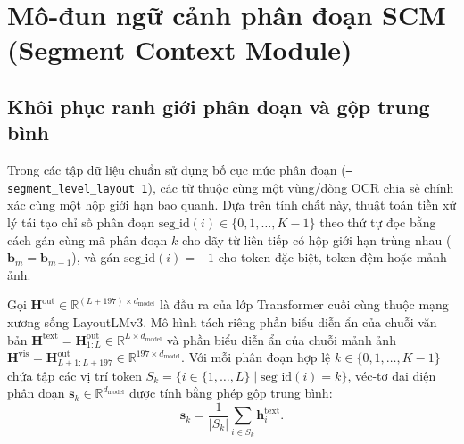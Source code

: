 \section{Mô-đun ngữ cảnh phân đoạn SCM (Segment Context Module)}
\subsection{Khôi phục ranh giới phân đoạn và gộp trung bình}
Trong các tập dữ liệu chuẩn sử dụng bố cục mức phân đoạn (\texttt{--segment\_}\allowbreak\texttt{level\_}\allowbreak\texttt{layout 1}), các từ thuộc cùng một vùng/dòng OCR chia sẻ chính xác cùng một hộp giới hạn bao quanh. Dựa trên tính chất này, thuật toán tiền xử lý tái tạo chỉ số phân đoạn $\text{seg\_id}(i) \in \{0, 1, \dots, K-1\}$ theo thứ tự đọc bằng cách gán cùng mã phân đoạn $k$ cho dãy từ liên tiếp có hộp giới hạn trùng nhau ($\mathbf{b}_m = \mathbf{b}_{m-1}$), và gán $\text{seg\_id}(i) = -1$ cho token đặc biệt, token đệm hoặc mảnh ảnh.

Gọi $\mathbf{H}^{\text{out}} \in \mathbb{R}^{(L + 197) \times d_{\text{model}}}$ là đầu ra của lớp Transformer cuối cùng thuộc mạng xương sống LayoutLMv3. Mô hình tách riêng phần biểu diễn ẩn của chuỗi văn bản $\mathbf{H}^{\text{text}} = \mathbf{H}_{1:L}^{\text{out}} \in \mathbb{R}^{L \times d_{\text{model}}}$ và phần biểu diễn ẩn của chuỗi mảnh ảnh $\mathbf{H}^{\text{vis}} = \mathbf{H}_{L+1:L+197}^{\text{out}} \in \mathbb{R}^{197 \times d_{\text{model}}}$. Với mỗi phân đoạn hợp lệ $k \in \{0, 1, \dots, K-1\}$ chứa tập các vị trí token $S_k = \{i \in \{1, \dots, L\} \mid \text{seg\_id}(i) = k\}$, véc-tơ đại diện phân đoạn $\mathbf{s}_k \in \mathbb{R}^{d_{\text{model}}}$ được tính bằng phép gộp trung bình:
\begin{equation}
    \label{eq:seg_mean_pool_ch3}
    \mathbf{s}_k = \frac{1}{|S_k|} \sum_{i \in S_k} \mathbf{h}_i^{\text{text}}.
\end{equation}

